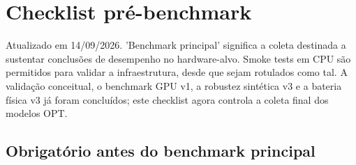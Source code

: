 

\chapter{Checklist pré-benchmark}





Atualizado em 14/09/2026. 'Benchmark principal' significa a coleta destinada a sustentar conclusões de desempenho no hardware-alvo. Smoke tests em CPU são permitidos para validar a infraestrutura, desde que sejam rotulados como tal. A validação conceitual, o benchmark GPU v1, a robustez sintética v3 e a bateria física v3 já foram concluídos; este checklist agora controla a coleta final dos modelos OPT.



\section{Obrigatório antes do benchmark principal}


